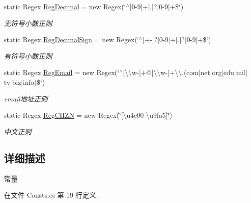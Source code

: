 \begin{DoxyCompactItemize}
static Regex \hyperlink{class_x_c_l_net_tools_1_1_common_1_1_consts_ae458af39aa12dc5dc1ec960a8c885aa5}{Reg\-Decimal} = new Regex(\char`\"{}$^\wedge$\mbox{[}0-\/9\mbox{]}+\mbox{[}.\mbox{]}?\mbox{[}0-\/9\mbox{]}+\$\char`\"{})
\begin{DoxyCompactList}\small\item\em 无符号小数正则 \end{DoxyCompactList}\item 
static Regex \hyperlink{class_x_c_l_net_tools_1_1_common_1_1_consts_a06acd9076fbb4b584a984142589eca11}{Reg\-Decimal\-Sign} = new Regex(\char`\"{}$^\wedge$\mbox{[}+-\/\mbox{]}?\mbox{[}0-\/9\mbox{]}+\mbox{[}.\mbox{]}?\mbox{[}0-\/9\mbox{]}+\$\char`\"{})
\begin{DoxyCompactList}\small\item\em 有符号小数正则 \end{DoxyCompactList}\item 
static Regex \hyperlink{class_x_c_l_net_tools_1_1_common_1_1_consts_a5a55d66840fa9e259ea63d77ae6b3d88}{Reg\-Email} = new Regex(\char`\"{}$^\wedge$\mbox{[}\textbackslash{}\textbackslash{}w-\/\mbox{]}+@\mbox{[}\textbackslash{}\textbackslash{}w-\/\mbox{]}+\textbackslash{}\textbackslash{}.(com$|$net$|$org$|$edu$|$mil$|$tv$|$biz$|$info)\$\char`\"{})
\begin{DoxyCompactList}\small\item\em email地址正则 \end{DoxyCompactList}\item 
static Regex \hyperlink{class_x_c_l_net_tools_1_1_common_1_1_consts_aeb4f95ff285059a276d3191ada22bce5}{Reg\-C\-H\-Z\-N} = new Regex(\char`\"{}\mbox{[}\textbackslash{}u4e00-\/\textbackslash{}u9fa5\mbox{]}\char`\"{})
\begin{DoxyCompactList}\small\item\em 中文正则 \end{DoxyCompactList}\end{DoxyCompactItemize}


\subsection{详细描述}
常量 



在文件 Consts.\-cs 第 19 行定义.



